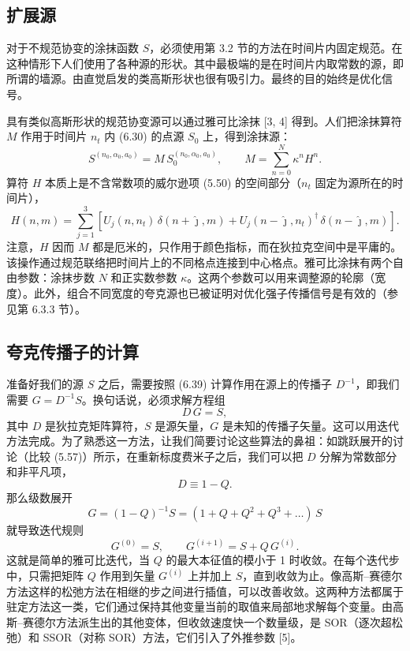 \subsection{扩展源}

对于不规范协变的涂抹函数 $S$，必须使用第 3.2 节的方法在时间片内固定规范。在这种情形下人们使用了各种源的形状。其中最极端的是在时间片内取常数的源，即所谓的墙源。由直觉启发的类高斯形状也很有吸引力。最终的目的始终是优化信号。

具有类似高斯形状的规范协变源可以通过雅可比涂抹 [3, 4] 得到。人们把涂抹算符 $M$ 作用于时间片 $n_t$ 内 (6.30) 的点源 $S_0$ 上，得到涂抹源：
\begin{equation}
  S^{(n_0,\alpha_0,a_0)} = M\, S_0^{(n_0,\alpha_0,a_0)}, \qquad
  M = \sum_{n=0}^{N} \kappa^n H^n .
\end{equation}
算符 $H$ 本质上是不含常数项的威尔逊项 (5.50) 的空间部分（$n_t$ 固定为源所在的时间片），
\begin{equation}
  H(n, m) = \sum_{j=1}^{3}\left[ U_j(n, n_t)\, \delta(n + \hat{\jmath}, m)
    + U_j(n - \hat{\jmath}, n_t)^\dagger\, \delta(n - \hat{\jmath}, m) \right].
\end{equation}
注意，$H$ 因而 $M$ 都是厄米的，只作用于颜色指标，而在狄拉克空间中是平庸的。该操作通过规范联络把时间片上的不同格点连接到中心格点。雅可比涂抹有两个自由参数：涂抹步数 $N$ 和正实数参数 $\kappa$。这两个参数可以用来调整源的轮廓（宽度）。此外，组合不同宽度的夸克源也已被证明对优化强子传播信号是有效的（参见第 6.3.3 节）。

\subsection{夸克传播子的计算}

准备好我们的源 $S$ 之后，需要按照 (6.39) 计算作用在源上的传播子 $D^{-1}$，即我们需要 $G = D^{-1}S$。换句话说，必须求解方程组
\begin{equation}
  D\, G = S ,
\end{equation}
其中 $D$ 是狄拉克矩阵算符，$S$ 是源矢量，$G$ 是未知的传播子矢量。这可以用迭代方法完成。为了熟悉这一方法，让我们简要讨论这些算法的鼻祖：如跳跃展开的讨论（比较 (5.57)）所示，在重新标度费米子之后，我们可以把 $D$ 分解为常数部分和非平凡项，
\begin{equation}
  D \equiv 1 - Q .
\end{equation}
那么级数展开
\begin{equation}
  G = (1 - Q)^{-1} S = (1 + Q + Q^2 + Q^3 + \ldots)\, S
\end{equation}
就导致迭代规则
\begin{equation}
  G^{(0)} = S , \qquad G^{(i+1)} = S + Q\, G^{(i)} .
\end{equation}
这就是简单的雅可比迭代，当 $Q$ 的最大本征值的模小于 1 时收敛。在每个迭代步中，只需把矩阵 $Q$ 作用到矢量 $G^{(i)}$ 上并加上 $S$，直到收敛为止。像高斯–赛德尔方法这样的松弛方法在相继的步之间进行插值，可以改善收敛。这两种方法都属于驻定方法这一类，它们通过保持其他变量当前的取值来局部地求解每个变量。由高斯–赛德尔方法派生出的其他变体，但收敛速度快一个数量级，是 SOR（逐次超松弛）和 SSOR（对称 SOR）方法，它们引入了外推参数 [5]。

